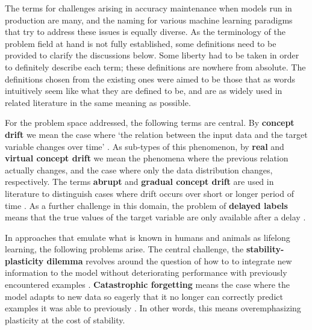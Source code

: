 




The terms for challenges arising in accuracy maintenance when models run in production are many, and the naming for various machine learning paradigms that try to address these issues is equally diverse. As the terminology of the problem field at hand is not fully established, some definitions need to be provided to clarify the discussions below. Some liberty had to be taken in order to definitely describe each term; these definitions are nowhere from absolute. The definitions chosen from the existing ones were aimed to be those that as words intuitively seem like what they are defined to be, and are as widely used in related literature in the same meaning as possible. 

For the problem space addressed, the following terms are central. By \textbf{concept drift} we mean the case where `the relation between the input
data and the target variable changes over time' \cite{conceptdriftsurvey}. As sub-types of this phenomenon, by \textbf{real} and \textbf{virtual concept drift} we mean the phenomena where the previous relation actually changes, and the case where only the data distribution changes, respectively. The terms \textbf{abrupt} and \textbf{gradual concept drift} are used in literature to distinguish cases where drift occurs over short or longer period of time \cite{zliobaite_driftsurvey}. As a further challenge in this domain, the problem of \textbf{delayed labels} means that the true values of the target variable are only available after a delay \cite{delayedlabelstreams}.

In approaches that emulate what is known in humans and animals as lifelong learning, the following problems arise. The central challenge, the \textbf{stability-plasticity dilemma} revolves around the question of how to to integrate new information to the model without deteriorating performance with previously encountered examples \cite{lmlinneuralnets}. \textbf{Catastrophic forgetting} means the case where the model adapts to new data so eagerly that it no longer can correctly predict examples it was able to previously \cite{lmlinneuralnets}. In other words, this means overemphasizing plasticity at the cost of stability.

